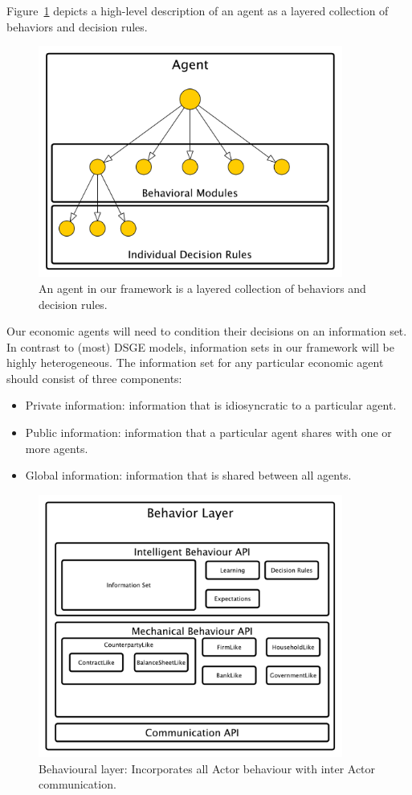 \documentclass[a4paper]{article}
\begin{document}
Figure~\ref{fig:BehaviorImage} depicts a high-level description of an agent as a layered collection of behaviors and decision rules.

\begin{figure}
\centering
\includegraphics[width=10cm]{img/hierarchical-actor.pdf}
\caption{An agent in our framework is a layered collection of behaviors and decision rules.}
\label{fig:BehaviorImage}
\end{figure}

Our economic agents will need to condition their decisions on an information set. In contrast to (most) DSGE models, information sets in our framework will be highly heterogeneous. The information set for any particular economic agent should consist of three components:
\begin{itemize}
    \item Private information: information that is idiosyncratic to a particular agent. 
    \item Public information: information that a particular agent shares with one or more agents.
    \item Global information: information that is shared between all agents.
\end{itemize}

\begin{figure}[H]
\centering
\includegraphics[width=10cm]{img/behavior-layer.pdf}
\caption{Behavioural layer: Incorporates all Actor behaviour with inter Actor communication.}
\label{fig:BehaviouralLayer}
\end{figure}
\end{document}
